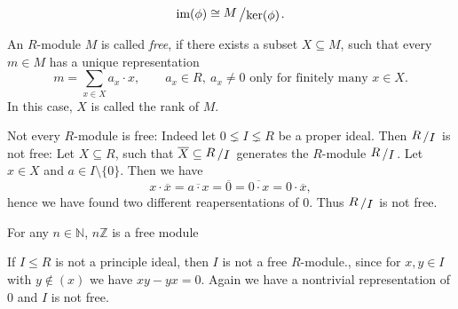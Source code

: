 \documentclass[11pt]{book}
\theoremstyle{nonumberbreak}
\newenvironment{er}[1][]{\ifthenelse{\equal{#1}{}}{\erinner}{\erinner[#1]}\rm}{\enderinner}
\newcommand{\slant}[2]{{\raisebox{.1em}{$#1$}\left/\raisebox{-.1em}{$#2$}\right.}}
\begin{document}
\begin{spacing}{1.3}
\begin{er}
\begin{compactenum}
$$ \textrm{im}(\phi) \cong \slant {M}{\ker(\phi)}.$$
\item An $R$-module $M$ is called \textit{free}, if there exists a subset $X \subseteq M$, such that every $m \in M$ has a unique representation
$$m = \sum_{x \in X} a_x \cdot x, \qquad a_x \in R, \ a_x\neq0 \textrm{ only for finitely many } x \in X.$$
In this case, $X$ is called the rank of $M$.
\item Not every $R$-module is free:
Indeed let $0 \lneq I \lneq R$ be a proper ideal. Then $\slant{R}{I}$ is not free:
Let $X \subseteq R$, such that $\overline{X} \subseteq \slant{R}{I}$ generates the $R$-module $\slant{R}{I}$. 
Let $x \in X$ and $a\in I \setminus \{0\}$. Then we have
$$x \cdot \overline{x} = \overline{a \cdot x}=\overline{0}=\overline{0\cdot x}= 0 \cdot \overline{x},$$
hence we have found two different reapersentations of $0$. Thus $\slant{R}{I}$ is not free.
\item For any $n \in \mathbb{N}$, $n\mathbb{Z}$ is a free module
\item If $I \leqslant R$ is not a principle ideal, then $I$ is not a free $R$-module., since for $x,y \in I$ with $y \notin ( x )$ we have $xy-yx=0$. Again we have a nontrivial representation of $0$ and $I$ is not free.
\end{compactenum}
\end{er}


\end{spacing}
\end{document}
